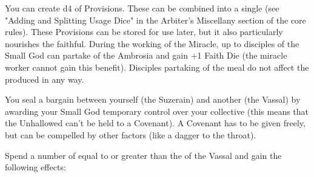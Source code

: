 






You can create \DICE d4 \UD of Provisions. These \UD can be combined into a single \UD (see "Adding and Splitting Usage Dice" in the Arbiter's Miscellany section of the core rules). These Provisions can be stored for use later, but it also particularly nourishes the faithful.  During the working of the Miracle, up to \DICE disciples of the Small God can partake of the Ambrosia and gain +1 Faith Die (the miracle worker cannot gain this benefit). Disciples partaking of the meal do not affect the \UD produced in any way.

\cbreak


You seal a bargain between yourself (the Suzerain) and another (the Vassal) by awarding your Small God temporary control over your collective  (this means that the Unhallowed can't be held to a Covenant).  A Covenant has to be given freely, but can be compelled by other factors (like a dagger to the throat).

Spend a number of \DICE equal to or greater than the \LVL of the Vassal and gain the following effects:

